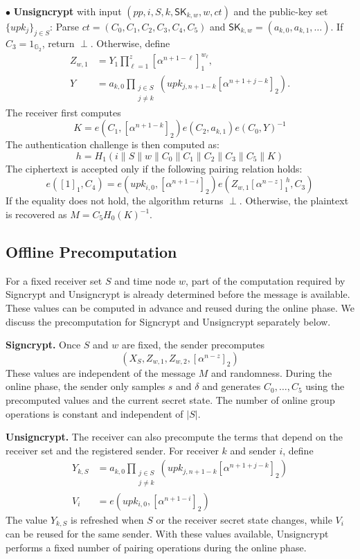 \documentclass[sigconf,anonymous]{acmart}
\theoremstyle{definition}
\theoremstyle{definition}
\theoremstyle{definition}
\theoremstyle{definition}
\theoremstyle{definition}
\theoremstyle{definition}
\theoremstyle{definition}
\theoremstyle{definition}
\theoremstyle{definition}
\begin{document}
\noindent$\bullet$ \textbf{Unsigncrypt}
with input $(pp,i,S,k,\mathsf{SK}_{k,w},w,ct)$ and the public-key set
$\{upk_j\}_{j\in S}$:
Parse $ct=(C_0,C_1,C_2,C_3,C_4,C_5)$ and
$\mathsf{SK}_{k,w}=(a_{k,0},a_{k,1},\ldots)$.
If $C_3=1_{\mathbb{G}_2}$, return $\perp$. Otherwise, define
\[
\begin{aligned}
Z_{w,1}
&=Y_1\prod_{\ell=1}^{z}[\alpha^{n+1-\ell}]_1^{w_\ell},\\
Y
&=a_{k,0}\prod_{\substack{j\in S\\j\neq k}}
\left(upk_{j,n+1-k}[\alpha^{n+1+j-k}]_2\right).
\end{aligned}
\]
The receiver first computes
\[
K=
e(C_1,[\alpha^{n+1-k}]_2)
e(C_2,a_{k,1})
e(C_0,Y)^{-1}
\]
The authentication challenge is then computed as:
\[
h=
H_1\left(
i\parallel S\parallel w\parallel
C_0\parallel C_1\parallel C_2\parallel C_3\parallel
C_5\parallel K
\right)
\]
The ciphertext is accepted only if the following pairing relation
holds:
\[
e([1]_1,C_4)
=
e\left(
upk_{i,0},
[\alpha^{n+1-i}]_2
\right)
e\left(
Z_{w,1}[\alpha^{n-z}]_1^{\,h},
C_3
\right)
\]
If the equality does not hold, the algorithm returns $\perp$.
Otherwise, the plaintext is recovered as
$M=C_5H_0(K)^{-1}$.


\subsection{Offline Precomputation}

For a fixed receiver set $S$ and time node $w$, part of the computation required by Signcrypt and Unsigncrypt is already determined before the message is available. These values can be computed in advance and reused during the online phase. We discuss the precomputation for Signcrypt and Unsigncrypt separately below.

\noindent\textbf{Signcrypt.}
Once $S$ and $w$ are fixed, the sender precomputes
\[
\left(
X_S,
Z_{w,1},
Z_{w,2},
[\alpha^{n-z}]_2
\right)
\]
These values are independent of the message $M$ and randomness. During the online phase, the sender only samples $s$ and $\delta$ and generates $C_0,\ldots,C_5$ using the precomputed values and the current secret state. The number of online group operations is constant and independent of $|S|$.

\noindent\textbf{Unsigncrypt.}
The receiver can also precompute the terms that depend on the receiver set and the registered sender. For receiver $k$ and sender $i$, define
\[
\begin{aligned}
	Y_{k,S}
	&=
	a_{k,0}
	\prod_{\substack{j\in S\\j\neq k}}
	\left(
	upk_{j,n+1-k}
	[\alpha^{n+1+j-k}]_2
	\right) \\
	V_i
	&=
	e\left(
	upk_{i,0},
	[\alpha^{n+1-i}]_2
	\right)
\end{aligned}
\]
The value $Y_{k,S}$ is refreshed when $S$ or the receiver secret state changes, while $V_i$ can be reused for the same sender. With these values available, Unsigncrypt performs a fixed number of pairing operations during the online phase.
\end{document}
